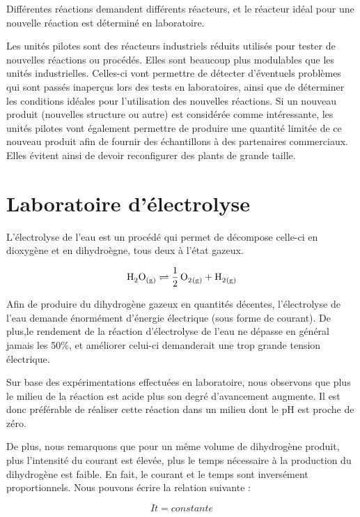 \documentclass[a4paper, oneside, 12pt]{article}
\begin{document}
Différentes réactions demandent différents réacteurs, et le réacteur idéal pour une nouvelle réaction est déterminé en laboratoire.
 
Les unités pilotes sont des réacteurs industriels réduits utilisés pour tester de nouvelles réactions ou procédés. Elles sont beaucoup plus modulables que les unités industrielles. Celles-ci vont permettre de détecter d'éventuels problèmes qui sont passés inaperçus lors des tests en laboratoires, ainsi que de déterminer les conditions idéales pour l'utilisation des nouvelles réactions. Si un nouveau produit (nouvelles structure ou autre) est considérée comme intéressante, les unités pilotes vont également permettre de produire une quantité limitée de ce nouveau produit afin de fournir des échantillons à des partenaires commerciaux. Elles évitent ainsi de devoir reconfigurer des plants de grande taille.

\section{Laboratoire d’électrolyse}

L'électrolyse de l'eau est un procédé qui permet de décompose celle-ci en dioxygène et en dihydroègne, tous deux à l'état gazeux.

\begin{equation*}
	\ce{H2O_{(g)} \rightleftharpoons  \frac{1}{2} \, O2_{(g)} + H2_{(g)}} 
\end{equation*}

Afin de produire du dihydrogène gazeux en quantités décentes, l'électrolyse de l'eau demande énormément d'énergie électrique (sous forme de courant). De plus,le rendement de la réaction d'électrolyse de l'eau ne dépasse en général jamais les 50\%, et améliorer celui-ci demanderait une trop grande tension électrique.

Sur base des expérimentations effectuées en laboratoire, nous observons que plus le milieu de la réaction est acide plus son degré d'avancement augmente. Il est donc préférable de réaliser cette réaction dans un milieu dont le pH est proche de zéro.

De plus, nous remarquons que pour un même volume de dihydrogène produit, plus l'intensité du courant est élevée, plus le temps nécessaire à la production du dihydrogène est faible. En fait, le courant et le temps sont inversément proportionnels. Nous pouvons écrire la relation suivante : 

\begin{equation*}
	It = constante
\end{equation*}
\end{document}
